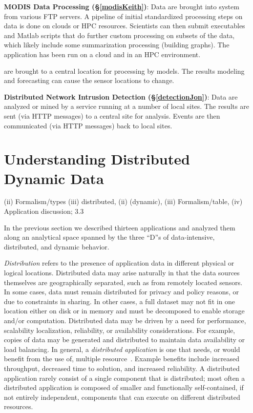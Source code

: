 \documentclass[times]{cpeauth}
\newcommand{\jhanote}[1]{ {\textcolor{blue} { ***Shantenu: #1 }}}
\begin{document}
{\bf MODIS Data Processing (\S\ref{modisKeith})}: Data are brought into system
from various FTP servers.  A pipeline of initial standardized processing steps
on data is done on clouds or HPC resources.  Scientists can then submit
executables and Matlab scripts that do further custom processing on subsets of
the data, which likely include some summarization processing (building graphs).
The application has been run on a cloud and in an HPC environment.

are brought to a central location for processing by models. The results %
modeling and forecasting can cause the sensor locations to change.

{\bf Distributed Network Intrusion Detection (\S\ref{detectionJon})}: Data are
analyzed or mined by a service running at a number of local sites. The results
are sent (via HTTP messages) to a central site for analysis. Events are then
communicated (via HTTP messages) back to local sites.

\section{Understanding Distributed Dynamic Data}\label{sec:distdyndata}

(ii) Formalism/types (iii) %
distributed, (ii) %
(dynamic), (iii) Formalism/table, (iv) Application discussion; 3.3 %


In the previous section we described thirteen applications and analyzed them
along an analytical space spanned by the three ``D''s of data-intensive,
distributed, and dynamic behavior.

\emph{Distribution} refers to the presence of application data in different
physical or logical locations. Distributed data may arise naturally in that the
data sources themselves are geographically separated, such as from remotely
located sensors.  In some cases, data must remain distributed for privacy and
policy reasons, or due to constraints in sharing.  In other cases, a full
dataset may not fit in one location either on disk or in memory and must be
decomposed to enable storage and/or computation. Distributed data may be driven
by a need for performance, scalability localization, reliability, or
availability considerations. For example, copies of data may be generated and
distributed to maintain data availability or load balancing.  In general, a
\emph{distributed application} is one that needs, or would benefit from the use
of, multiple resource~\cite{dpa_surveypaper}. Example benefits include increased
throughput, decreased time to solution, and increased reliability.  A
distributed application rarely consist of a single component that is
distributed; most often a distributed application is composed of smaller and
functionally self-contained, if not entirely independent, components that can
execute on different distributed resources.
\end{document}
